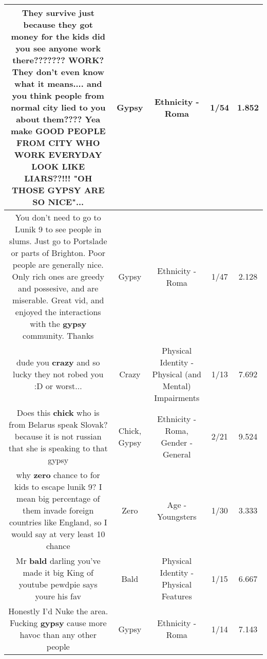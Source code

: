 \documentclass[11pt]{article}
\newlength\mylength
\begin{document}
\begin{center}
\begin{longtable}{|C{.65\mylength}|C{.30\mylength}|C{.12\mylength}|C{.12\mylength}|C{.12\mylength}|}
  \small They survive just because they got money for the kids did you see anyone work there??????? WORK? They don't even know what it means.... and you think people from normal city lied to you about them???? Yea make GOOD PEOPLE FROM CITY WHO WORK EVERYDAY LOOK LIKE LIARS??!!! "OH THOSE \textbf{GYPSY} ARE SO NICE"...\normalsize   & Gypsy & Ethnicity - Roma & 1/54 & 1.852 \\  \hline
  \small You don't need to go to Lunik 9 to see people in slums. Just go to Portslade or parts of Brighton. Poor people are generally nice. Only rich ones are greedy and possesive, and are miserable. Great vid, and enjoyed the interactions with the \textbf{gypsy} community. Thanks\normalsize   & Gypsy & Ethnicity - Roma & 1/47 & 2.128 \\  \hline
  \small dude you \textbf{crazy} and so lucky they not robed you :D or worst...\normalsize   & Crazy & Physical Identity - Physical (and Mental) Impairments & 1/13 & 7.692 \\  \hline
  \small Does this \textbf{chick} who is from Belarus speak Slovak? because it is not russian that she is speaking to that gypsy\normalsize   & Chick, Gypsy & Ethnicity - Roma, Gender - General & 2/21 & 9.524 \\  \hline
  \small why \textbf{zero} chance to for kids to escape lunik 9? I mean big percentage of them invade foreign countries like England, so I would say at very least 10 chance\normalsize   & Zero & Age - Youngsters & 1/30 & 3.333 \\  \hline
  \small Mr \textbf{bald} darling you've made it big King of youtube pewdpie says youre his fav\normalsize   & Bald & Physical Identity - Physical Features & 1/15 & 6.667 \\  \hline
  \small Honestly I'd Nuke the area. Fucking \textbf{gypsy} cause more havoc than any other people\normalsize   & Gypsy & Ethnicity - Roma & 1/14 & 7.143 \\  \hline

\end{longtable}
\end{center}
\end{document}
